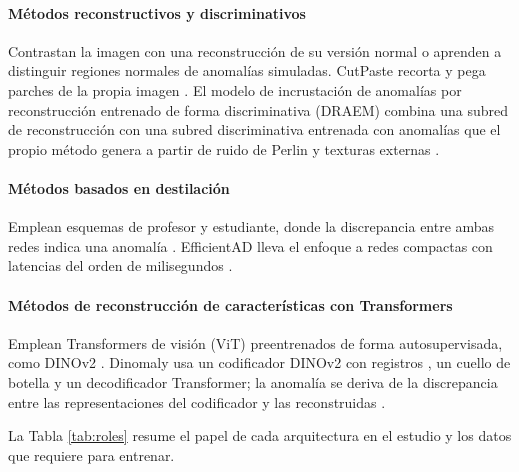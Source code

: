 \documentclass[12pt,oneside]{report}
\begin{document}
\paragraph{Métodos reconstructivos y discriminativos} Contrastan la imagen con una reconstrucción de su versión normal o aprenden a distinguir regiones normales de anomalías simuladas. CutPaste recorta y pega parches de la propia imagen \cite{li2021}. El modelo de incrustación de anomalías por reconstrucción entrenado de forma discriminativa (DRAEM) combina una subred de reconstrucción con una subred discriminativa entrenada con anomalías que el propio método genera a partir de ruido de Perlin y texturas externas \cite{zavrtanik2021,perlin1985}.

\paragraph{Métodos basados en destilación} Emplean esquemas de profesor y estudiante, donde la discrepancia entre ambas redes indica una anomalía \cite{bergmann2020,deng2022}. EfficientAD lleva el enfoque a redes compactas con latencias del orden de milisegundos \cite{batzner2024}.

\paragraph{Métodos de reconstrucción de características con Transformers} Emplean Transformers de visión (ViT) \cite{dosovitskiy2021} preentrenados de forma autosupervisada, como DINOv2 \cite{oquab2024}. Dinomaly usa un codificador DINOv2 con registros \cite{darcet2024}, un cuello de botella y un decodificador Transformer; la anomalía se deriva de la discrepancia entre las representaciones del codificador y las reconstruidas \cite{guo2025}.

La Tabla \ref{tab:roles} resume el papel de cada arquitectura en el estudio y los datos que requiere para entrenar.
\end{document}
